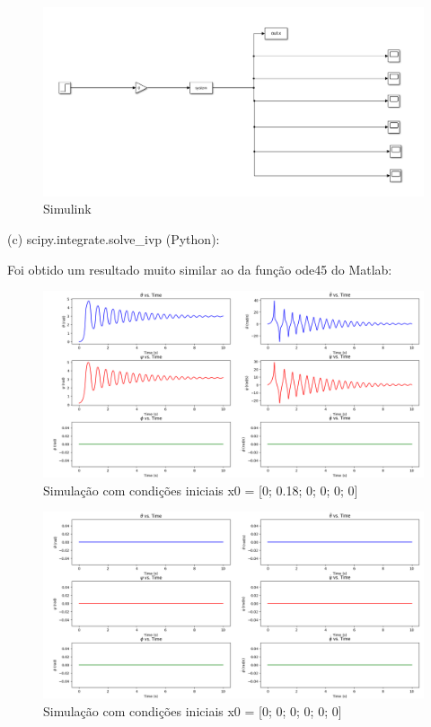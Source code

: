 \documentclass[10pt]{article}
\begin{document}
\begin{figure}[h]
    \centering
    \includegraphics[scale=0.5]{simulink.png}
    \caption{Simulink}
\end{figure}

\newpage

\quad (c) scipy.integrate.solve\_ivp (Python):

\quad Foi obtido um resultado muito similar ao da função ode45 do Matlab:

\begin{figure}[h]
    \centering
    \includegraphics[scale=0.4]{solve_ivp_1.png}
    \caption{Simulação com condições iniciais x0 = [0; 0.18; 0; 0; 0; 0]}
\end{figure}

\begin{figure}[h]
    \centering
    \includegraphics[scale=0.4]{solve_ivp_2.png}
    \caption{Simulação com condições iniciais x0 = [0; 0; 0; 0; 0; 0]}
\end{figure}
\end{document}
